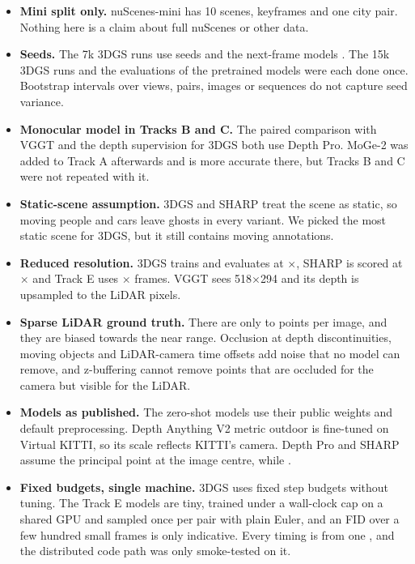 \documentclass[10pt]{article}
\newcommand{\gpu}{\GPUname}
\begin{document}
\begin{itemize}
  \item \textbf{Mini split only.} nuScenes-mini has 10 scenes, \GTkeyframes{} keyframes and one city pair.
        Nothing here is a claim about full nuScenes or other data.
  \item \textbf{Seeds.} The 7k 3DGS runs use \GSnSeeds{} seeds and the next-frame models \NFnSeeds{}. The
        15k 3DGS runs and the evaluations of the pretrained models were each done once. Bootstrap
        intervals over views, pairs, images or sequences do not capture seed variance.
  \item \textbf{Monocular model in Tracks B and C.} The paired comparison with VGGT and the depth
        supervision for 3DGS both use Depth Pro. MoGe-2 was added to Track A afterwards and is more
        accurate there, but Tracks B and C were not repeated with it.
  \item \textbf{Static-scene assumption.} 3DGS and SHARP treat the scene as static, so moving people and
        cars leave ghosts in every variant. We picked the most static scene for 3DGS, but it still contains
        \GSsceneMoving{} moving annotations.
  \item \textbf{Reduced resolution.} 3DGS trains and evaluates at \GSimageW$\times$\GSimageH, SHARP is
        scored at \SharpEvalW$\times$\SharpEvalH{} and Track E uses \NFw$\times$\NFh{} frames. VGGT sees
        518$\times$294 and its depth is upsampled to the LiDAR pixels.
  \item \textbf{Sparse LiDAR ground truth.} There are only \GTptsMin{} to \GTptsMax{} points per image, and
        they are biased towards the near range. Occlusion at depth discontinuities, moving objects and
        LiDAR-camera time offsets add noise that no model can remove, and z-buffering cannot remove points
        that are occluded for the camera but visible for the LiDAR.
  \item \textbf{Models as published.} The zero-shot models use their public weights and default
        preprocessing. Depth Anything V2 metric outdoor is fine-tuned on Virtual KITTI, so its scale
        reflects KITTI's camera. Depth Pro and SHARP assume the principal point at the image centre, while
        \PPsentence{}.
  \item \textbf{Fixed budgets, single machine.} 3DGS uses fixed step budgets without tuning. The Track E
        models are tiny, trained under a wall-clock cap on a shared GPU and sampled once per pair with
        plain Euler, and an FID over a few hundred small frames is only indicative. Every timing is from
        one \gpu{}, and the distributed code path was only smoke-tested on it.
\end{itemize}
\end{document}

